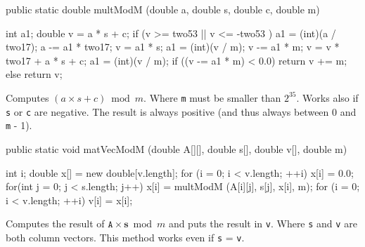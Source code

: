 \begin{code}

   public static double multModM (double a, double s, double c, double m) \begin{hide} {
      int a1;
      double v = a * s + c;
      if (v >= two53 || v <= -two53 ) {
         a1 = (int)(a / two17);
         a -= a1 * two17;
         v  = a1 * s;
         a1 = (int)(v / m);
         v -= a1 * m;
         v  = v * two17 + a * s + c;
      }
      a1 = (int)(v / m);
      if ((v -= a1 * m) < 0.0)
         return v += m;
      else
         return v;
   } \end{hide}
\end{code}
\begin{tabb} Computes $(a \times s + c) \bmod m$. Where \texttt{m} must
 be smaller than $2^{35}$. Works also if \texttt{s} or \texttt{c} are negative.
 The result is always positive (and thus always between 0 and \texttt{m} - 1).
\end{tabb}
\begin{htmlonly}
\end{htmlonly}
\begin{code}

   public static void matVecModM (double A[][], double s[], double v[],
                                  double m) \begin{hide} {
      int i;
      double x[] = new double[v.length];
      for (i = 0; i < v.length;  ++i) {
         x[i] = 0.0;
         for(int j = 0; j < s.length; j++)
            x[i] = multModM (A[i][j], s[j], x[i], m);
      }
      for (i = 0; i < v.length;  ++i)
         v[i] = x[i];
   } \end{hide}
\end{code}
\begin{tabb} Computes the result of $\mathtt{A} \times \mathtt{\mathbf{s}}
  \bmod m$ and puts the
  result in \texttt{v}. Where \texttt{s} and \texttt{v} are both column vectors. This
  method works even if \texttt{s} = \texttt{v}.
\end{tabb}
\begin{htmlonly}
\end{htmlonly}
